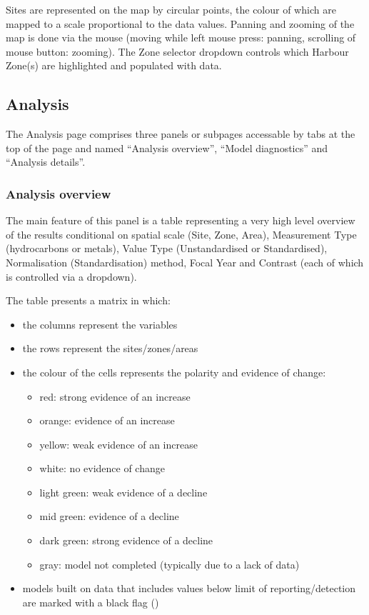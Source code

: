 \documentclass[
  8pt,
  a4paper]{article}
\providecommand{\tightlist}{%
  \setlength{\itemsep}{0pt}\setlength{\parskip}{0pt}}\usepackage{longtable,booktabs,array}
\begin{document}
Sites are represented on the map by circular points, the colour of which
are mapped to a scale proportional to the data values. Panning and
zooming of the map is done via the mouse (moving while left mouse press:
panning, scrolling of mouse button: zooming). The Zone selector dropdown
controls which Harbour Zone(s) are highlighted and populated with data.

\subsection{Analysis}\label{analysis}

The Analysis page comprises three panels or subpages accessable by tabs
at the top of the page and named ``Analysis overview'', ``Model
diagnostics'' and ``Analysis details''.

\subsubsection{Analysis overview}\label{analysis-overview}

The main feature of this panel is a table representing a very high level
overview of the results conditional on spatial scale (Site, Zone, Area),
Measurement Type (hydrocarbons or metals), Value Type (Unstandardised or
Standardised), Normalisation (Standardisation) method, Focal Year and
Contrast (each of which is controlled via a dropdown).

The table presents a matrix in which:

\begin{itemize}
\item
  the columns represent the variables
\item
  the rows represent the sites/zones/areas
\item
  the colour of the cells represents the polarity and evidence of
  change:

  \begin{itemize}
  \tightlist
  \item
    red: strong evidence of an increase
  \item
    orange: evidence of an increase
  \item
    yellow: weak evidence of an increase
  \item
    white: no evidence of change
  \item
    light green: weak evidence of a decline
  \item
    mid green: evidence of a decline
  \item
    dark green: strong evidence of a decline
  \item
    gray: model not completed (typically due to a lack of data)
  \end{itemize}
\item
  models built on data that includes values below limit of
  reporting/detection are marked with a black flag ({})
\end{itemize}
\end{document}

